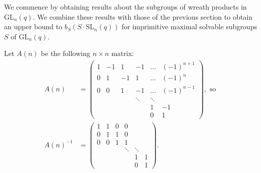 \documentclass[a4paper,reqno,11pt]{amsart}
\theoremstyle{definition}
\theoremstyle{remark}
\numberwithin{equation}{section}
\newcommand{\SL}{{\mathrm{SL}}}
\newcommand{\GL}{{\mathrm{GL}}}
\begin{document}
We commence by obtaining  results about the  subgroups of wreath products in $\GL_n(q).$ We combine these results with those of the previous section to obtain 
an upper bound to $b_S(S \cdot \SL_n(q))$ for imprimitive maximal solvable subgroups $S$ of $\GL_n(q).$   

\medskip

Let $A(n)$  be the following $n \times n$ matrix:
\begin{equation}\label{igrek}
\begin{aligned}
A(n) & = \begin{pmatrix}
1      & -1     & 1      & -1     & \ldots & (-1)^{n+1}         \\
0      &   1    & -1     & 1      & \ldots &  (-1)^{n}         \\
0      &    0   & 1      & -1     & \ldots &  (-1)^{n-1}        \\
       &        &        & \ddots &\ddots  &          \\
       &        &        &        & 1      & -1        \\
       &        &        &        & 0      &  1      
\end{pmatrix}, \text{ so } \\
A(n)^{-1} & =
\begin{pmatrix}
1      & 1      & 0      & 0      &        &          \\
0      &   1    & 1      & 0      &        &           \\
0      &    0   & 1      & 1      &        &          \\
       &        &        & \ddots &\ddots  &          \\
       &        &        &        & 1      & 1        \\
       &        &        &        & 0      &  1      
\end{pmatrix}.
\end{aligned}
\end{equation}
\end{document}
